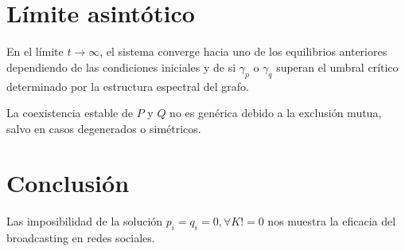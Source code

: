 \documentclass[11pt,a4paper]{article}
\begin{document}
\section{Límite asintótico}

En el límite $t \to \infty$, el sistema converge hacia uno de los equilibrios anteriores dependiendo de las condiciones iniciales y de si $\gamma_p$ o $\gamma_q$ superan el umbral crítico determinado por la estructura espectral del grafo.

La coexistencia estable de $P$ y $Q$ no es genérica debido a la exclusión mutua, salvo en casos degenerados o simétricos.

\section{Conclusión}
Las imposibilidad de la solución $p_i=q_i=0, \forall K!=0$ nos muestra la eficacia del broadcasting en redes sociales.
\end{document}
